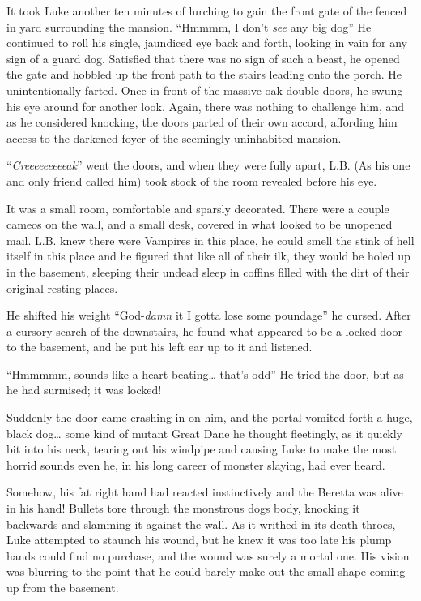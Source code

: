 It took Luke another ten minutes of lurching to gain the front gate of
the fenced in yard surrounding the mansion. ``Hmmmm, I don't {\em see}
any big dog'' He continued to roll his single, jaundiced eye back and
forth, looking in vain for any sign of a guard dog. Satisfied that there
was no sign of such a beast, he opened the gate and hobbled up the front
path to the stairs leading onto the porch. He unintentionally
farted. Once in front of the massive oak double-doors, he swung his eye
around for another look. Again, there was nothing to challenge him, and
as he considered knocking, the doors parted of their own accord,
affording him access to the darkened foyer of the seemingly uninhabited
mansion.

``{\em Creeeeeeeeeak}'' went the doors, and when they were fully apart,
L.B. (As his one and only friend called him) took stock of the room
revealed before his eye.

It was a small room, comfortable and sparsly decorated. There were
a couple cameos on the wall, and a small desk, covered in what
looked to be unopened mail. L.B. knew there were Vampires in this
place, he could smell the stink of hell itself in this place and he
figured that like all of their ilk, they would be holed up in the
basement, sleeping their undead sleep in coffins filled with the
dirt of their original resting places.

He shifted his weight ``God-{\em damn} it I gotta lose some poundage''
he cursed. After a cursory search of the downstairs, he found what
appeared to be a locked door to the basement, and he put his left ear up
to it and listened.

``Hmmmmm, sounds like a heart beating{\ldots} that's odd'' He tried the
door, but as he had surmised; it was locked!

Suddenly the door came crashing in on him, and the portal vomited
forth a huge, black dog{\ldots} some kind of mutant Great Dane he thought
fleetingly, as it quickly bit into his neck, tearing out his
windpipe and causing Luke to make the most horrid sounds even he,
in his long career of monster slaying, had ever heard.

Somehow, his fat right hand had reacted instinctively and the
Beretta was alive in his hand! Bullets tore through the monstrous
dogs body, knocking it backwards and slamming it against the wall.
As it writhed in its death throes, Luke attempted to staunch his
wound, but he knew it was too late his plump hands could find no
purchase, and the wound was surely a mortal one. His vision was
blurring to the point that he could barely make out the small shape
coming up from the basement.

